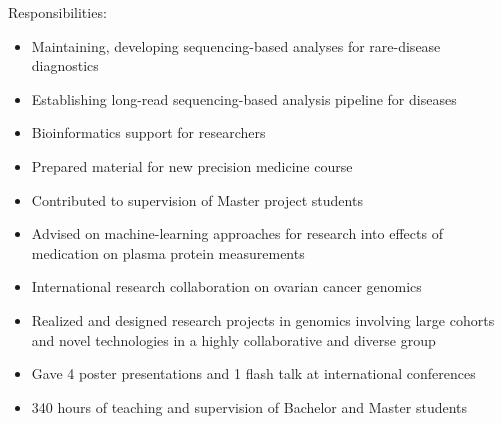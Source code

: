 \documentclass[9pt,a4paper,ragged2e,withhyper,normalphoto]{altacv}
\begin{document}
\begin{paracol}{2}
Responsibilities:
\begin{itemize}
  \item Maintaining, developing sequencing-based analyses for rare-disease diagnostics
  \item Establishing long-read sequencing-based analysis pipeline for diseases
  \item Bioinformatics support for researchers
\end{itemize}
\divider

\begin{itemize}
  \item Prepared material for new precision medicine course
  \item Contributed to supervision of Master project students
  \item Advised on machine-learning approaches for research into effects of medication on plasma protein measurements
\end{itemize}
\divider

\begin{itemize}
  \item International research collaboration on ovarian cancer genomics
\end{itemize}

\divider

\begin{itemize}
  \item Realized and designed research projects in genomics involving large cohorts and novel technologies in a highly collaborative and diverse group
  \item Gave 4 poster presentations and 1 flash talk at international conferences
  \item 340 hours of teaching and supervision of Bachelor and Master students


\end{itemize}
\end{paracol}
\end{document}
